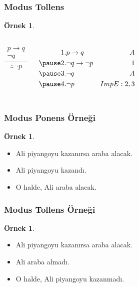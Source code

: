 \documentclass[dvipsnames]{beamer}
\theoremstyle{definition}
\theoremstyle{example}
\newtheorem{ornek}[theorem]{Örnek}
\theoremstyle{plain}
\begin{document}
\begin{frame}
  \frametitle{Modus Tollens}

  \begin{ornek}
    \begin{columns}
      \[
      \frac
        {
          \begin{array}{c}
            p \rightarrow q\\
            \neg q
          \end{array}
        }
        {
          \therefore \neg p
        }
      \]

      \pause
      \begin{eqnarray*}
        1. & p \rightarrow q           & A\\
        \pause
        2. & \neg q \rightarrow \neg p & 1\\
        \pause
        3. & \neg q                    & A\\
        \pause
        4. & \neg p                    & ImpE:2,3\\
      \end{eqnarray*}
    \end{columns}
  \end{ornek}
\end{frame}

\begin{frame}
  \frametitle{Modus Ponens Örneği}

  \begin{ornek}
    \begin{itemize}
      \item Ali piyangoyu kazanırsa araba alacak.
      \item Ali piyangoyu kazandı.

      \pause
      \medskip
      \item O halde, Ali araba alacak.
    \end{itemize}
  \end{ornek}
\end{frame}

\begin{frame}
  \frametitle{Modus Tollens Örneği}

  \begin{ornek}
    \begin{itemize}
      \item Ali piyangoyu kazanırsa araba alacak.
      \item Ali araba almadı.

      \pause
      \medskip
      \item O halde, Ali piyangoyu kazanmadı.
    \end{itemize}
  \end{ornek}
\end{frame}
\end{document}
